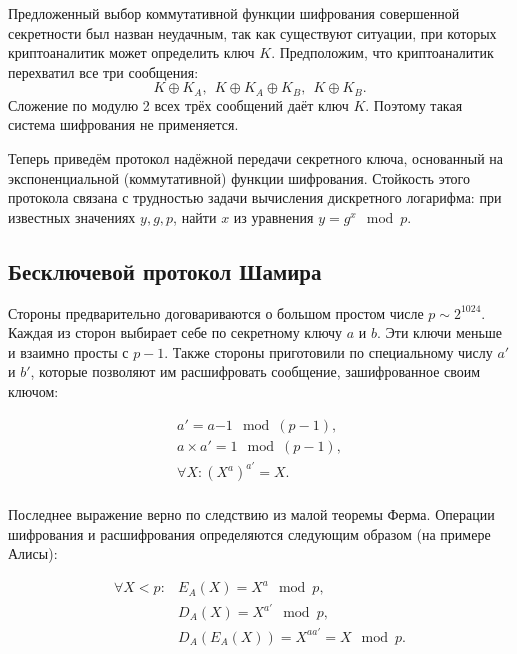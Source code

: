 Предложенный выбор коммутативной функции шифрования совершенной секретности был назван неудачным, так как существуют ситуации, при которых криптоаналитик может определить ключ $K$. Предположим, что криптоаналитик перехватил все три сообщения:
    \[ K \oplus K_A, ~~ K \oplus K_A \oplus K_B, ~~ K \oplus K_B. \]
Сложение по модулю 2 всех трёх сообщений даёт ключ $K$. Поэтому такая система шифрования не применяется.

Теперь приведём протокол надёжной передачи секретного ключа, основанный на экспоненциальной (коммутативной) функции шифрования. Стойкость этого протокола связана с трудностью задачи вычисления дискретного логарифма: при известных значениях $y, g, p$, найти $x$ из уравнения $y = g^x \mod p$.

\subsection{Бесключевой протокол Шамира}

Стороны предварительно договариваются о большом простом числе $p \sim 2^{1024}$. Каждая из сторон выбирает себе по секретному ключу $a$ и $b$. Эти ключи меньше и взаимно просты с $p-1$. Также стороны приготовили по специальному числу $a'$ и $b'$, которые позволяют им расшифровать сообщение, зашифрованное своим ключом:

\[\begin{array}{l}
a' = a{-1} \mod (p-1), \\
a \times a' = 1 \mod (p-1), \\
\forall X: (X^a)^{a'} = X. \\
\end{array}\]

Последнее выражение верно по следствию из малой теоремы Ферма. Операции шифрования и расшифрования определяются следующим образом (на примере Алисы):

\[\begin{array}{ll}
\forall X < p:	& E_A( X ) = X^{a} \mod p, \\
		& D_A( X ) = X^{a'} \mod p, \\
		& D_A( E_A( X ) ) = X^{aa'} = X \mod p. \\
\end{array}\]

